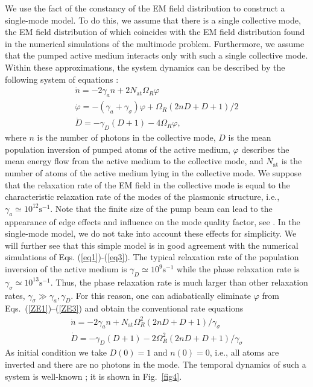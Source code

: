 \documentclass[aps,prapplied,amsmath,amssymb,onecolumn,superscriptaddress,showpacs,floatfix,longbibliography]{revtex4-1}
\begin{document}
We use the fact of the constancy of the EM field distribution to construct a single-mode model. To do this, we assume that there is a single collective mode, the EM field distribution of which coincides with the EM field distribution found in the numerical simulations of the multimode problem. Furthermore, we assume that the pumped active medium interacts only with such a single collective mode. Within these approximations, the system dynamics can be described by the following system of equations \cite{SiegmanLasers}:
\begin{gather} 
\dot n =  - 2{\gamma _a}n + 2{N_{\text{at}}}{\Omega _R}\varphi \label{ZE1}
\\
\dot \varphi = - \left( {{\gamma _a} + {\gamma _\sigma }} \right)\varphi + {\Omega _R}\left( {2nD + D + 1} \right)/2 \label{ZE2}
\\
\dot D =  - {\gamma _D}\left( {D + 1} \right) - 4{\Omega _R}\varphi, \label{ZE3}
\end{gather}
where $n$ is the number of photons in the collective mode, $D$ is the mean population inversion of pumped atoms of the active medium, $\varphi$ describes the mean energy flow from the active medium to the collective mode, and $N_{\text{at}}$ is the number of atoms of the active medium lying in the collective mode.
We suppose that the relaxation rate of the EM field in the collective mode is equal to the characteristic relaxation rate of the modes of the plasmonic structure, i.e., $\gamma_a \simeq 10^{12} \text{s}^{-1}$.
Note that the finite size of the pump beam can lead to the appearance of edge effects and influence on the mode quality factor, see \cite{hakala2017lasing}.
In the single-mode model, we do not take into account these effects for simplicity.
We will further see that this simple model is in good agreement with the numerical simulations of Eqs. (\ref{eq1})-(\ref{eq3}).
The typical relaxation rate of the population inversion of the active medium is $\gamma_D \simeq 10^9 \text{s}^{-1}$ while the phase relaxation rate is $\gamma_{\sigma}\simeq 10^{13} \text{s}^{-1}$.
Thus, the phase relaxation rate is much larger than other relaxation rates, $\gamma_\sigma \gg \gamma_a, \gamma_D$.
For this reason, one can adiabatically eliminate $\varphi$ from Eqs.~(\ref{ZE1})--(\ref{ZE3}) and obtain the conventional rate equations
\begin{gather} 
\dot n =  - 2 {\gamma _a}n + {N_{\text{at}}}\Omega _R^2\left( {2nD + D + 1} \right)/{\gamma _\sigma } \label{RE1}
\\
\dot D =  - {\gamma _D}\left( {D + 1} \right) - 2\Omega _R^2\left( {2nD + D + 1} \right)/{\gamma _\sigma } \label{RE2}
\end{gather}
As initial condition we take $D(0) = 1$ and $n(0) = 0$, i.e., all atoms are inverted and there are no photons in the mode.
The temporal dynamics of such a system is well-known \cite{SiegmanLasers}; it is shown in Fig.~\ref{fig4}.
\end{document}
